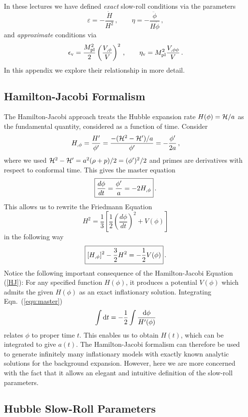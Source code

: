 \documentclass[12pt,letterpaper,rotate]{article}
\def\beq{\begin{equation}}
\def\eeq{\end{equation}}
\def\Mp{M_{\rm pl}}
\def\d{{\rm d}}
\begin{document}
{In these lectures we have defined {\it exact} slow-roll conditions via the parameters
\beq
\varepsilon = - \frac{\dot H}{H^2}\, ,\qquad \eta = - \frac{\ddot \phi}{H \dot \phi}\, ,
\eeq
and {\it approximate} conditions via
\beq
\epsilon_{\rm v} = \frac{\Mp^2}{2} \left(\frac{V_{,\phi}}{V} \right)^2\, , \qquad \eta_{\rm v} = \Mp^2 \frac{V_{, \phi \phi}}{V}\, .
\eeq
In this appendix we explore their relationship in more detail.

\subsection{Hamilton-Jacobi Formalism}
The Hamilton-Jacobi approach treats the Hubble expansion rate $H(\phi)= {\cal H}/a$ as the fundamental quantity, considered as a function of time.
Consider
\beq
H_{,\phi} = \frac{H'}{\phi'} = \frac{- ({\cal H}^2 -{\cal H}')/a}{\phi'} = - \frac{\phi'}{2a}\, ,
\eeq
where we used ${\cal H}^2 -{\cal H}' = a^2 (\rho + p)/2 =  (\phi')^2/2$ and primes are derivatives with respect to conformal time. This gives the master equation
\beq
\label{equ:master}
\fbox{$\displaystyle
\frac{d \phi}{d t} = \frac{\phi'}{a} = -2 H_{,\phi}$}\, .
\eeq
This allows us to rewrite the Friedmann Equation
\beq
H^2 = \frac{1}{3} \left[\frac{1}{2} \left(\frac{d \phi}{d t}\right)^2 +V(\phi)\right]
\eeq
in the following way
\beq
\label{HJ}
\fbox{$\displaystyle
[H_{,\phi}]^2 -\frac{3}{2} H^2 = -\frac{1}{2} V(\phi)$}\, .
\eeq
Notice the following important consequence of the Hamilton-Jacobi Equation (\ref{HJ}): For any specified function $H(\phi)$, it produces a potential $V(\phi)$ which admits the given $H(\phi)$ as an exact inflationary solution.
Integrating Eqn.~(\ref{equ:master})
\beq
\int \d t = -\frac{1}{2} \int \frac{\d \phi}{ H'(\phi)}
\eeq
relates $\phi$ to proper time $t$. This enables us to obtain $H(t)$, which can be integrated to give $a(t)$. The Hamilton-Jacobi formalism can therefore be used to generate infinitely many inflationary models with exactly known analytic solutions for the background expansion. However, here we are more concerned with the fact that it allows an elegant and intuitive definition of the slow-roll parameters. 

\subsection{Hubble Slow-Roll Parameters}

}
\end{document}
